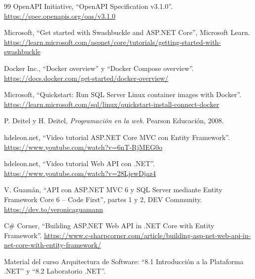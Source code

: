 \documentclass[12pt,letterpaper]{article}
\newcommand{\asignatura}{Arquitectura de Software}
\begin{document}
\begin{thebibliography}{99}
 OpenAPI Initiative, \enquote{OpenAPI Specification v3.1.0}.
  \url{https://spec.openapis.org/oas/v3.1.0}

 Microsoft, \enquote{Get started with Swashbuckle and ASP.NET Core},
  Microsoft Learn. \url{https://learn.microsoft.com/aspnet/core/tutorials/getting-started-with-swashbuckle}

 Docker Inc., \enquote{Docker overview} y \enquote{Docker Compose
  overview}. \url{https://docs.docker.com/get-started/docker-overview/}

 Microsoft, \enquote{Quickstart: Run SQL Server Linux container
  images with Docker}. \url{https://learn.microsoft.com/sql/linux/quickstart-install-connect-docker}

 P. Deitel y H. Deitel, \emph{Programación en la web}. Pearson Educación,
  2008.

 hdeleon.net, \enquote{Video tutorial ASP.NET Core MVC con Entity
  Framework}. \url{https://www.youtube.com/watch?v=6nT-RjMEG0o}

 hdeleon.net, \enquote{Video tutorial Web API con .NET}.
  \url{https://www.youtube.com/watch?v=28LjewDjaz4}

 V. Guamán, \enquote{API con ASP.NET MVC 6 y SQL Server mediante Entity
  Framework Core 6 -- Code First}, partes 1 y 2, DEV Community.
  \url{https://dev.to/veronicaguamann}

 C\# Corner, \enquote{Building ASP.NET Web API in .NET Core with
  Entity Framework}.
  \url{https://www.c-sharpcorner.com/article/building-asp-net-web-api-in-net-core-with-entity-framework/}

 Material del curso \asignatura: \enquote{8.1 Introducción a la Plataforma
  .NET} y \enquote{8.2 Laboratorio .NET}.

\end{thebibliography}
\end{document}
